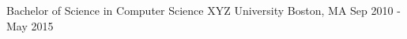 
\begin{cventries}
  \cventry
    {Bachelor of Science in Computer Science} %
    {XYZ University} %
    {Boston, MA} %
    {Sep 2010 - May 2015} %
    {
    }
\end{cventries}